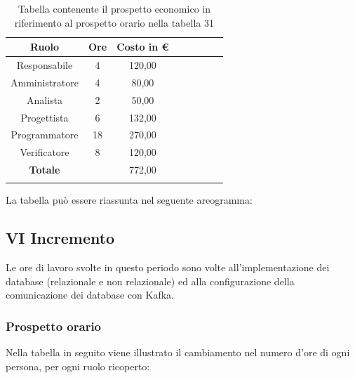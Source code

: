 			\begin{longtable}{|c|c|c|c|c|c|c|c}
				\hline
				\rowcolor{lighter-grayer}
				\textbf{Ruolo} & \textbf{Ore} & \textbf{Costo in €} \\
				\hline
				\endfirsthead
				\hline
			Responsabile 	    & 4 & 120,00\\
			\hline 
			\hline
			Amministratore	  & 4 & 80,00\\
			\hline
			\hline
			Analista 				& 2 & 50,00\\
			\hline
			\hline
			Progettista 		  & 6 & 132,00\\
			\hline
			\hline
			Programmatore 	 & 18 & 270,00\\
			\hline
			\hline
			Verificatore 		  & 8 & 120,00\\
			\hline
			\textbf{Totale} 	&  & 772,00\\
			\hline
				
				\caption{Tabella contenente il prospetto economico in riferimento al prospetto orario nella tabella 31}
			\end{longtable}
			\pagebreak
			
			La tabella può essere riassunta nel seguente areogramma:

		
		
		\subsection{VI Incremento}
		Le ore di lavoro svolte in questo periodo sono volte all'implementazione dei database (relazionale e non relazionale) ed alla configurazione della comunicazione dei database con Kafka.
		\subsubsection{Prospetto orario}
			Nella tabella in seguito viene illustrato il cambiamento nel numero d'ore di ogni persona, per ogni ruolo ricoperto:
			
